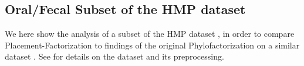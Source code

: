 



\subsection{Oral/Fecal Subset of the HMP dataset}
\label{ch:Factorization:sec:Evaluation:sub:OralFecalHMPDataset}

We here show the analysis of a subset of the \acf{HMP} dataset \cite{Huttenhower2012,Methe2012},
in order to compare Placement-Factorization to findings of the original Phylofactorization
on a similar dataset \cite{Washburne2017a}.
See  for details on the dataset and its preprocessing.

